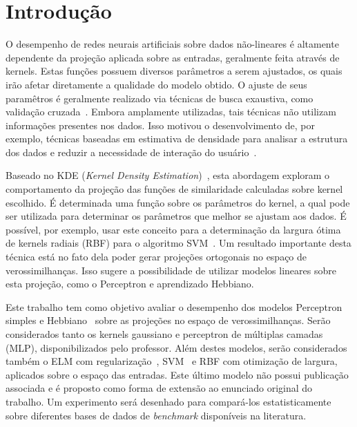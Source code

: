 \documentclass[conference]{IEEEtran}
\begin{document}
	\section{Introdução}
	
	O desempenho de redes neurais artificiais sobre dados não-lineares é altamente dependente da projeção aplicada sobre as entradas, geralmente feita através de kernels. Estas funções possuem diversos parâmetros a serem ajustados, os quais irão afetar diretamente a qualidade do modelo obtido. O ajuste de seus paramêtros é geralmente realizado via técnicas de busca exaustiva, como validação cruzada~\cite{cortes1995support}. Embora amplamente utilizadas, tais técnicas não utilizam informações presentes nos dados. Isso motivou o desenvolvimento de, por exemplo, técnicas baseadas em estimativa de densidade para analisar a estrutura dos dados e reduzir a necessidade de interação do usuário~\cite{menezes2019width}. 
	
	Baseado no KDE (\textit{Kernel Density Estimation})~\cite{wang2013gaussian}, esta abordagem exploram o comportamento da projeção das funções de similaridade calculadas sobre kernel escolhido. É determinada uma função sobre os parâmetros do kernel, a qual pode ser utilizada para determinar os parâmetros que melhor se ajustam aos dados. É possível, por exemplo, usar este conceito para a determinação da largura ótima de kernels radiais (RBF) para o algoritmo SVM~\cite{menezes2019width}. Um resultado importante desta técnica está no fato dela poder gerar projeções ortogonais no espaço de verossimilhanças. Isso sugere a possibilidade de utilizar modelos lineares sobre esta projeção, como o Perceptron e aprendizado Hebbiano.
	
	Este trabalho tem como objetivo avaliar o desempenho dos modelos Perceptron simples \cite{rosenblatt1957perceptron} e Hebbiano~\cite{fernandez2011direct} sobre as projeções no espaço de verossimilhanças. Serão considerados tanto os kernels gaussiano e perceptron de múltiplas camadas (MLP), disponibilizados pelo professor. Além destes modelos, serão considerados também o ELM com regularização~\cite{huang2004extreme}, SVM~\cite{menezes2017otimizaccao, menezes2019width} e RBF com otimização de largura, aplicados sobre o espaço das entradas. Este último modelo não possui publicação associada e é proposto como forma de extensão ao enunciado original do trabalho. 
	Um experimento será desenhado para compará-los estatisticamente sobre diferentes bases de dados de \textit{benchmark} disponíveis na literatura. 
	
\end{document}
